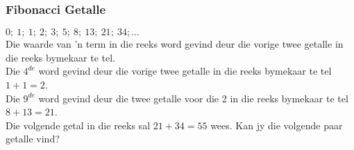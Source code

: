 \subsubsection*{Fibonacci Getalle}
$0;~1;~1;~2;~3;~5;~8;~13;~21;~34;...$\\
Die waarde van ’n term in die reeks word gevind deur die vorige twee getalle in die reeks bymekaar te tel.\\
Die $4^{de}$ word gevind deur die vorige twee getalle in die reeks bymekaar te tel $1+1=2$.\\
Die $9^{de}$  word gevind deur die twee
getalle voor die 2 in die reeks bymekaar te tel $8+13=21$.\\
Die volgende getal in die reeks sal $21+34=55$ wees.
Kan jy die volgende paar getalle vind?


